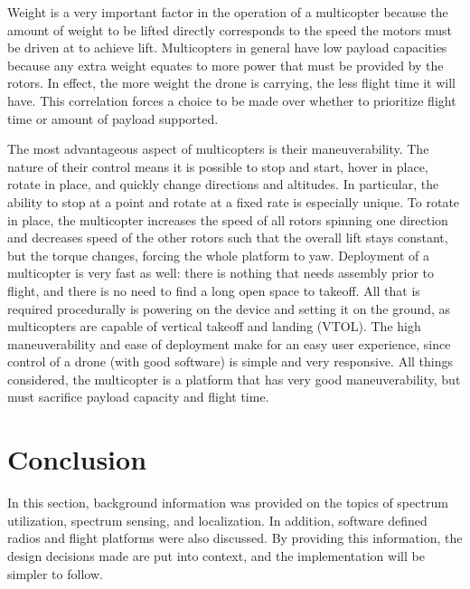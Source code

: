 Weight is a very important factor in the operation of a multicopter because the amount of weight to be lifted directly corresponds to the speed the motors must be driven at to achieve lift. Multicopters in general have low payload capacities because any extra weight equates to more power that must be provided by the rotors. In effect, the more weight the drone is carrying, the less flight time it will have. This correlation forces a choice to be made over whether to prioritize flight time or amount of payload supported.\par
The most advantageous aspect of multicopters is their maneuverability. The nature of their control means it is possible to stop and start, hover in place, rotate in place, and quickly change directions and altitudes. In particular, the ability to stop at a point and rotate at a fixed rate is especially unique. To rotate in place, the multicopter increases the speed of all rotors spinning one direction and decreases speed of the other rotors such that the overall lift stays constant, but the torque changes, forcing the whole platform to yaw.\cite{multicopter_dynamics} Deployment of a multicopter is very fast as well: there is nothing that needs assembly prior to flight, and there is no need to find a long open space to takeoff. All that is required procedurally  is powering on the device and setting it on the ground, as multicopters are capable of vertical takeoff and landing (VTOL). The high maneuverability and ease of deployment make for an easy user experience, since control of a drone (with good software) is simple and very responsive. All things considered, the multicopter is a platform that has very good maneuverability, but must sacrifice payload capacity and flight time.

\section{Conclusion}
In this section, background information was provided on the topics of spectrum utilization, spectrum sensing, and localization. In addition, software defined radios and flight platforms were also discussed.  By providing this information, the design decisions made are put into context, and the implementation will be simpler to follow.
